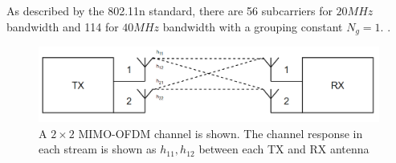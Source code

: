 As described by the 802.11n standard, there are 56 subcarriers for $20MHz$ bandwidth and 114 for $40MHz$ bandwidth with a grouping constant $N_g = 1$.  \citep{full802.11nStandard}.
\begin{figure}[h]
\begin{center}
  \includegraphics[scale=0.5]{Figures/MIMO2.PNG}
\end{center}
  \caption{A $2\times 2$ MIMO-OFDM channel is shown. The channel response in each stream is shown as $h_{11}, h_{12}$ between each TX and RX antenna}
  \vspace{-10pt}
  \label{fig:MIMO-OFDM}
\end{figure}
